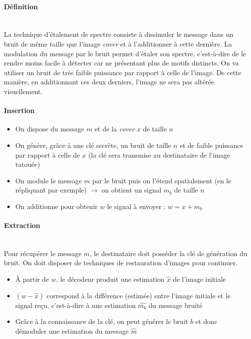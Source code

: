 \paragraph{Définition}~\\\indent
La technique d'étalement de spectre consiste à dissimuler le message dans un bruit de même taille que l'image \emph{cover} et à l'additionner à cette dernière.
La modulation du message par le bruit permet d'étaler son spectre, c'est-à-dire de le rendre moins facile à détecter car ne présentant plus de motifs distincts.
On va utiliser un bruit de très faible puissance par rapport à celle de l'image. De cette manière, en additionnant ces deux derniers, l'image ne sera pas altérée visuellement.

\paragraph{Insertion}
\begin{itemize}
\item
On dispose du message $m$ et de la \emph{cover} $x$ de taille $n$
\item
On génère, grâce à une clé secrète, un bruit de taille $n$ et de faible puissance par rapport à celle de $x$ (la clé sera transmise au destinataire de l'image tatouée)
\item
On module le message $m$ par le bruit puis on l'étend spatialement (en le répliquant par exemple) $\rightarrow$ on obtient un signal $m_{b}$ de taille $n$
\item
On additionne pour obtenir $w$ le signal à envoyer : $w = x + m_{b}$
\end{itemize}

\paragraph{Extraction}~\\\indent
Pour récupérer le message $m$, le destinataire doit posséder la clé de génération du bruit. On doit disposer de techniques de restauration d'images pour continuer.
\begin{itemize}
\item
À partir de $w$, le décodeur produit une estimation $\hat{x}$ de l'image initiale
\item
$(w-\hat{x})$ correspond à la différence (estimée) entre l'image initiale et le signal reçu, c'est-à-dire à une estimation $\hat{m_{b}}$ du message bruité
\item
Grâce à la connaissance de la clé, on peut générer le bruit $b$ et donc démoduler une estimation du message $\hat{m}$
\end{itemize}

